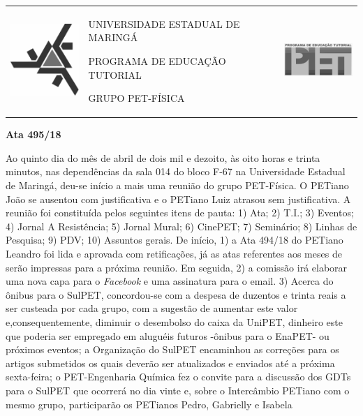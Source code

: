 \documentclass[a4paper,12pt]{report}
\begin{document}

\begin{center}
	\begin{tabular}{m{3.0cm}m{10.0cm}m{3.0cm}}
		\includegraphics[width=3.0cm]{uemp.png} &
		\begin{center}
			\large UNIVERSIDADE ESTADUAL DE MARINGÁ
	
			\large PROGRAMA DE EDUCAÇÃO TUTORIAL          
		
			\large GRUPO PET-FÍSICA						   
		\end{center} 							   &
		
		\includegraphics[width=3.0cm]{petp.png} \\
	\end{tabular}
\end{center}
\vspace{0.7cm}

\begin{center}
	{\large {\bf Ata 495/18}}
\end{center}

\vspace{0.4cm}

Ao quinto dia do mês de abril de dois mil e dezoito, 
às oito horas e trinta minutos, nas dependências da sala 014 do bloco F-67 na Universidade Estadual de Maringá, deu-se início a mais uma reunião do grupo PET-Física. O PETiano João se ausentou com justificativa e o PETiano Luiz atrasou sem justificativa. A reunião foi constituída pelos seguintes itens de pauta: 
1) Ata;
2) T.I.;
3) Eventos;
4) Jornal A Resistência;
5) Jornal Mural; 
6) CinePET; 
7) Seminário; 
8) Linhas de Pesquisa; 
9) PDV; 
10) Assuntos gerais. 
De início, 
1) a Ata 494/18 do PETiano Leandro foi lida e aprovada com retificações, já as atas referentes aos meses de serão impressas para a próxima reunião. 
Em seguida, 
2) a comissão irá elaborar uma nova capa para o {\itshape Facebook} e uma assinatura para o email.  
3) Acerca do ônibus para o SulPET, concordou-se com a despesa de duzentos e trinta reais a ser custeada por cada grupo, com a sugestão de aumentar este valor e,consequentemente, diminuir o desembolso do caixa da UniPET, dinheiro este que poderia ser empregado em aluguéis futuros -ônibus para o EnaPET- ou próximos eventos; a Organização do SulPET encaminhou as correções para os artigos submetidos    
os quais deverão ser atualizados e enviados até a próxima sexta-feira; o PET-Engenharia Química fez o convite para a discussão dos GDTs para o SulPET que ocorrerá no dia vinte e, sobre o Intercâmbio PETiano com o mesmo grupo, participarão os PETianos Pedro, Gabrielly e Isabela
\end{document}
